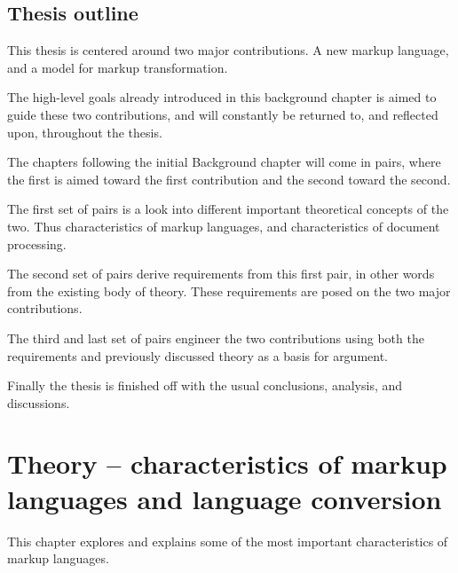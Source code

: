 \documentclass{scrreprt}
\begin{document}
\section{Thesis outline}
\color{red}
This thesis is centered around two major contributions. A new markup language, and a model for markup transformation.

The high-level goals already introduced in this background chapter is aimed to guide these two contributions, and will constantly be returned to, and reflected upon, throughout the thesis.

The chapters following the initial Background chapter will come in pairs, where the first is aimed toward the first contribution and the second toward the second.

The first set of pairs is a look into different important theoretical concepts of the two. Thus characteristics of markup languages, and characteristics of document processing.

The second set of pairs derive requirements from this first pair, in other words from the existing body of theory. These requirements are posed on the two major contributions.

The third and last set of pairs engineer the two contributions using both the requirements and previously discussed theory as a basis for argument.

Finally the thesis is finished off with the usual conclusions, analysis, and discussions.
\color{black}

























%
%
%
%
%
%


\chapter{Theory -- characteristics of markup languages and language conversion}
\label{sec:theory}
This chapter explores and explains some of the most important characteristics of markup languages.
\end{document}
